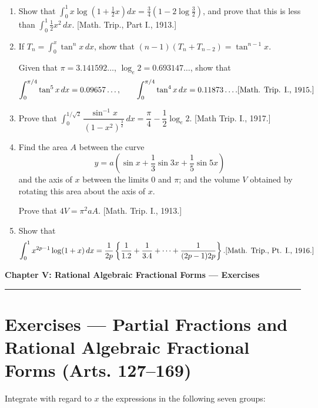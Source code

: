 \documentclass[11pt, a4paper]{article}
\newcommand{\source}[1]{\hfill\textnormal{[#1]}}
\begin{document}
\begin{enumerate}[leftmargin=2em]
\item Show that $\displaystyle\int_0^1 x\log\left(1+\tfrac12x\right)dx = \tfrac34\left(1-2\log\tfrac32\right)$, and prove that this is less than $\displaystyle\int_0^1 \tfrac12x^2\,dx$. \source{Math. Trip., Part I., 1913.}

\item If $T_n=\displaystyle\int_0^x \tan^nx\,dx$, show that $(n-1)(T_n+T_{n-2})=\tan^{n-1}x$.

Given that $\pi=3.141592\dots$, $\log_e2=0.693147\dots$, show that
\[
\int_0^{\pi/4}\tan^5x\,dx = 0.09657\dots,\qquad \int_0^{\pi/4}\tan^4x\,dx = 0.11873\dots. \source{Math. Trip. I., 1915.}
\]

\item Prove that $\displaystyle\int_0^{1/\sqrt2} \dfrac{\sin^{-1}x}{(1-x^2)^{\frac32}}\,dx = \dfrac{\pi}{4}-\dfrac12\log_e2$. \source{Math Trip. I., 1917.}

\item Find the area $A$ between the curve
\[
y=a\left(\sin x+\dfrac13\sin 3x+\dfrac15\sin 5x\right)
\]
and the axis of $x$ between the limits $0$ and $\pi$; and the volume $V$ obtained by rotating this area about the axis of $x$.

Prove that $4V=\pi^2aA$. \source{Math. Trip. I., 1913.}

\item Show that
\[
\int_0^1 x^{2p-1}\log(1+x)\,dx = \dfrac{1}{2p}\left\{\dfrac{1}{1.2}+\dfrac{1}{3.4}+\dots+\dfrac{1}{(2p-1)2p}\right\}. \source{Math. Trip., Pt. I., 1916.}
\]

\end{enumerate}

\newpage

\begin{center}
    {\LARGE \bfseries \color{accent} Chapter V: Rational Algebraic Fractional Forms --- Exercises}\\
    \vspace{0.2cm}
    {\color{accent}\rule{0.55\linewidth}{0.8pt}}
\end{center}
\vspace{0.35cm}

\section*{Exercises --- Partial Fractions and Rational Algebraic Fractional Forms (Arts. 127--169)}

Integrate with regard to $x$ the expressions in the following seven groups:
\end{document}
